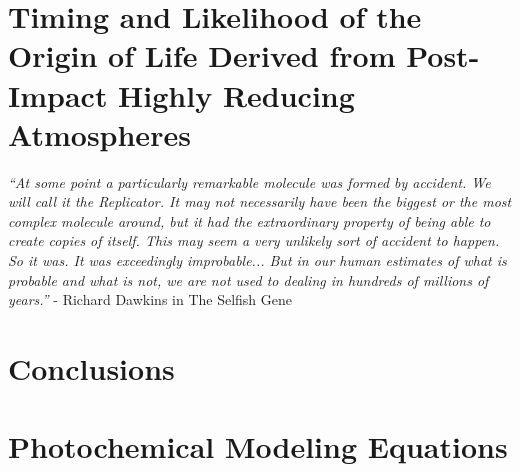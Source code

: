 \documentclass[11pt, proquest]{uwthesis}[2016/11/22]
\begin{document}
\chapter{Timing and Likelihood of the Origin of Life Derived from Post-Impact Highly Reducing Atmospheres} \label{ch:6}
\noindent \emph{``At some point a particularly remarkable molecule was formed by accident. We will call it the Replicator. It may not necessarily have been the biggest or the most complex molecule around, but it had the extraordinary property of being able to create copies of itself. This may seem a very unlikely sort of accident to happen. So it was. It was exceedingly improbable... But in our human estimates of what is probable and what is not, we are not used to dealing in hundreds of millions of years.''} - Richard Dawkins in The Selfish Gene
\newpage


\chapter{Conclusions}
\newpage


\printendnotes

%
%


%
%
\appendix
\raggedbottom\sloppy
 
 
\chapter{Photochemical Modeling Equations}
\newpage

 
\end{document}
